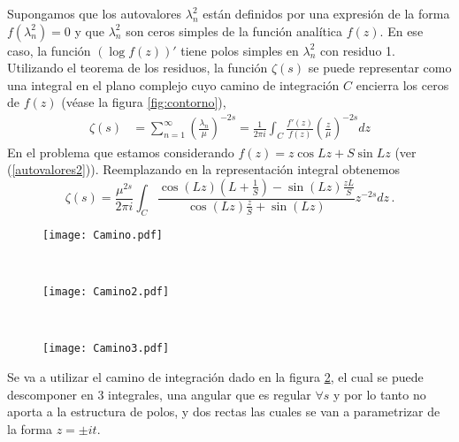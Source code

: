 Supongamos que los autovalores $\lambda ^2 _n$ están definidos por una expresión de
la forma $f ( \lambda ^2 _ n ) = 0$ y que $\lambda ^2 _n$  son ceros simples de la función analítica $f (z)$.
En ese caso, la función $( \log f (z))'$ tiene polos simples en $\lambda ^2 _n$ con residuo 1.
Utilizando el teorema de los residuos, la función $\zeta (s)$ se puede representar
como una integral en el plano complejo cuyo camino de integración $C$
encierra los ceros de $f (z)$ (véase la figura \ref{fig:contorno}),
\begin{equation}
\begin{aligned}
   \zeta  (s) &=  \sum _{n=1} ^{\infty} \left( \frac{\lambda _n}{\mu} \right) ^{-2s} 
   =  
   \frac{1}{2 \pi i} \int _{C} \frac{f'(z)}{f(z)} \left( \frac{z}{\mu} \right) ^{-2s} dz 
\end{aligned}
\label{asd}
\end{equation}
En el problema que estamos considerando $f(z) = z \cos Lz + S \sin Lz$ (ver (\ref{autovalores2})). Reemplazando en la representación integral obtenemos
\begin{equation}
	\zeta  (s) = 
    \frac{\mu ^{2s}}{2 \pi i} \int _{C}
    \frac{ \cos (L z) \left(L + \frac{1}{S} \right) - \sin(L z) \frac{z L}{S}
    }
    { \cos(L z) \frac{z}{S} + \sin(L z)
    }
     z  ^{-2 s} dz  \, .
\end{equation}
\begin{figure*}[t!]
    \centering
    \begin{subfigure}[t]{0.3\textwidth}
        \centering
        \texttt{[image: Camino.pdf]}
        \caption{}
        \label{fig.izquierda}
    \end{subfigure}%
    ~ 
    \begin{subfigure}[t]{0.3\textwidth}
        \centering
        \texttt{[image: Camino2.pdf]}
        \caption{}
        \label{fig.derecha}
    \end{subfigure}
    ~
    \begin{subfigure}[t]{0.3\textwidth}
        \centering
        \texttt{[image: Camino3.pdf]}
        \caption{}
        \label{fig.derecha.derecha}
    \end{subfigure}
    \caption{Estos caminos son los tenidos en cuenta para representar a la {\it función-$\zeta$} como una integral en el plano complejo.}
\label{fig:contorno}
\end{figure*}
Se va a utilizar el camino de integración dado en la figura \ref{fig.derecha}, el cual se puede descomponer en 3 integrales, una angular que es regular $ \forall s$ y por lo tanto no aporta a la estructura de polos, y dos rectas las cuales se van a parametrizar de la forma $z = \pm i  t$. 
